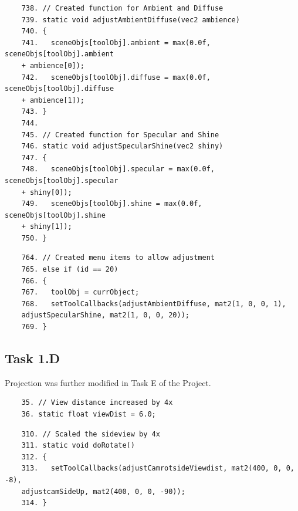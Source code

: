 \documentclass{article}
\begin{document}
\begin{commandline}
	\begin{verbatim}
	738. // Created function for Ambient and Diffuse
	739. static void adjustAmbientDiffuse(vec2 ambience)
	740. {
	741.   sceneObjs[toolObj].ambient = max(0.0f, sceneObjs[toolObj].ambient
	+ ambience[0]);
	742.   sceneObjs[toolObj].diffuse = max(0.0f, sceneObjs[toolObj].diffuse
	+ ambience[1]);
	743. }
	744.
	745. // Created function for Specular and Shine
	746. static void adjustSpecularShine(vec2 shiny)
	747. {
	748.   sceneObjs[toolObj].specular = max(0.0f, sceneObjs[toolObj].specular
	+ shiny[0]);
	749.   sceneObjs[toolObj].shine = max(0.0f, sceneObjs[toolObj].shine
	+ shiny[1]);
	750. }
	\end{verbatim}
\end{commandline}

\begin{commandline}
	\begin{verbatim}
	764. // Created menu items to allow adjustment
	765. else if (id == 20)
	766. {
	767.   toolObj = currObject;
	768.   setToolCallbacks(adjustAmbientDiffuse, mat2(1, 0, 0, 1),
	adjustSpecularShine, mat2(1, 0, 0, 20));
	769. }
	\end{verbatim}
\end{commandline}

\subsection{Task 1.D}\label{sec:1D}

\begin{info} %
	Projection was further modified in Task E of the Project.
\end{info}

\begin{commandline}
	\begin{verbatim}
	35. // View distance increased by 4x
	36. static float viewDist = 6.0;
	\end{verbatim}
\end{commandline}

\begin{commandline}
	\begin{verbatim}
	310. // Scaled the sideview by 4x
	311. static void doRotate()
	312. {
	313.   setToolCallbacks(adjustCamrotsideViewdist, mat2(400, 0, 0, -8),
	adjustcamSideUp, mat2(400, 0, 0, -90));
	314. }
	\end{verbatim}
\end{commandline}
\end{document}
